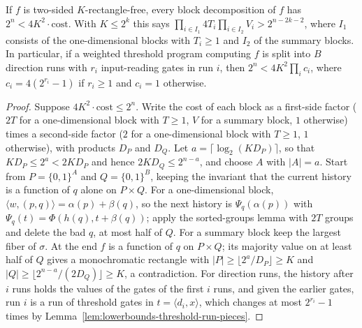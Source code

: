 \begin{theorem}
  \label{thm:lowerbounds-threshold-capacity}
  \leanok
  If $f$ is two-sided $K$-rectangle-free, every block decomposition of $f$ has
  $2^n<4K^2\cdot\mathrm{cost}$. With $K\le2^k$ this says
  $\prod_{i\in I_1}4T_i\prod_{i\in I_2}V_i>2^{n-2k-2}$, where $I_1$ consists of the
  one-dimensional blocks with $T_i\ge1$ and $I_2$ of the summary blocks. In
  particular, if a weighted threshold program computing $f$ is split into $B$
  direction runs with $r_i$ input-reading gates in run $i$, then
  $2^n<4K^2\prod_ic_i$, where $c_i=4(2^{r_i}-1)$ if $r_i\ge1$ and $c_i=1$
  otherwise.
\end{theorem}
\begin{proof}
  \leanok
  Suppose $4K^2\cdot\mathrm{cost}\le2^n$. Write the cost of each block as a
  first-side factor ($2T$ for a one-dimensional block with $T\ge1$, $V$ for a
  summary block, $1$ otherwise) times a second-side factor ($2$ for a
  one-dimensional block with $T\ge1$, $1$ otherwise), with products $D_P$ and $D_Q$.
  Let $a=\lceil\log_2(KD_P)\rceil$, so that $KD_P\le2^a<2KD_P$ and hence
  $2KD_Q\le2^{n-a}$, and choose $A$ with $|A|=a$. Start from $P=\{0,1\}^A$ and
  $Q=\{0,1\}^B$, keeping the invariant that the current history is a function of
  $q$ alone on $P\times Q$. For a one-dimensional block,
  $\langle w,(p,q)\rangle=\alpha(p)+\beta(q)$, so the next history is
  $\Psi_q(\alpha(p))$ with $\Psi_q(t)=\Phi(h(q),t+\beta(q))$; apply the
  sorted-groups lemma with $2T$ groups and delete the bad $q$, at most half of $Q$.
  For a summary block keep the largest fiber of $\sigma$. At the end $f$ is a
  function of $q$ on $P\times Q$; its majority value on at least half of $Q$ gives
  a monochromatic rectangle with $|P|\ge\lfloor2^a/D_P\rfloor\ge K$ and
  $|Q|\ge\lfloor2^{n-a}/(2D_Q)\rfloor\ge K$, a contradiction. For direction runs,
  the history after $i$ runs holds the values of the gates of the first $i$ runs,
  and given the earlier gates, run $i$ is a run of threshold gates in
  $t=\langle d_i,x\rangle$, which changes at most $2^{r_i}-1$ times by
  Lemma~\ref{lem:lowerbounds-threshold-run-pieces}.
\end{proof}

